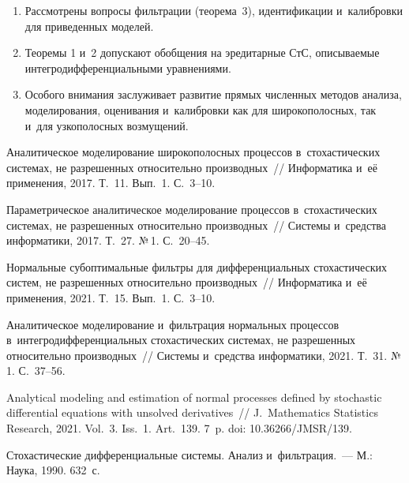 \begin{multicols}{2}
\begin{enumerate}[1.]
\item  Рассмотрены вопросы фильтрации (теорема~3), идентификации и~калибровки для приведенных моделей.

\item  Теоремы 1 и~2 допускают обобщения на эредитарные СтС, описываемые 
ин\-тег\-ро\-диф\-фе\-рен\-ци\-аль\-ны\-ми 
уравнениями.

\item  Особого внимания заслуживает развитие прямых численных методов анализа, 
моделирования, оценивания и~калибровки как для широкополосных, так и~для узкополосных \mbox{возмущений}.
\end{enumerate}




{\small\frenchspacing
 {%
 \begin{thebibliography}{99}

Аналитическое моделирование широкополосных процессов в~стохастических сис\-те\-мах, 
не разрешенных относительно производных~// Информатика и~её применения, 2017. Т.~11. Вып.~1. С.~3--10.

Параметрическое аналитическое моделирование процессов в~стохастических  сис\-те\-мах,
 не разрешенных относительно производных~// Сис\-те\-мы и~средства информатики, 2017. Т.~27. №\,1. С.~20--45.

Нормальные субоптимальные фильт\-ры для дифференциальных стохастических сис\-тем, 
не разрешенных относительно производных~// Информатика и~её применения, 2021. Т.~15. Вып.~1. С.~3--10.

Аналитическое моделирование и~фильтрация нормальных процессов в~интегродифференциальных 
стохастических сис\-те\-мах, не разрешенных относительно производных~// Сис\-те\-мы и~средства информатики, 2021.
 Т.~31. №\,1. С.~37--56.

Analytical modeling and estimation of normal processes defined by stochastic differential 
equations with unsolved derivatives~// J.~Mathematics Statistics Research, 2021. Vol.~3. Iss.~1. Art.~139. 
7~p. doi: 10.36266/\linebreak JMSR/139.

Стохастические дифференциальные сис\-те\-мы. Анализ и~фильтрация.~--- М.:
Наука,  1990.  632~с. 


\end{thebibliography}}}
\end{multicols}
